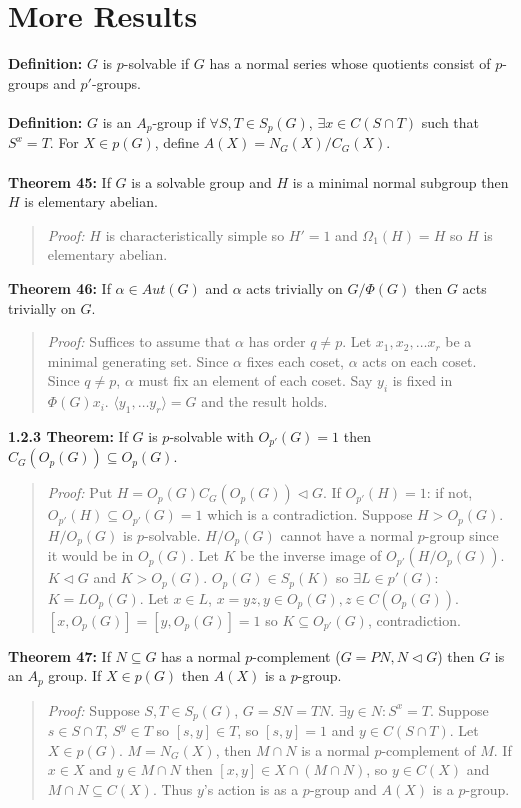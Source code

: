 \section {More Results}
{\bf Definition:} $G$ is $p$-solvable if $G$ has a normal series whose quotients consist of $p$-groups
and $p'$-groups.
\\
\\
{\bf Definition:} $G$ is an $A_p$-group if $\forall S, T \in S_p(G)$, $\exists x \in C(S \cap T)$ such that
$S^x = T$.  For $X \in p(G)$, define $A(X) = N_G(X)/C_G(X)$.
\\
\\
{\bf Theorem 45:} If $G$ is a solvable group and $H$ is a minimal normal subgroup then $H$ is elementary abelian.
\begin{quote}
\emph{Proof:}
$H$ is characteristically simple so $H' = 1$ and $\Omega_1(H) = H$ so $H$ is elementary abelian.
\end{quote}
{\bf Theorem 46:} If $\alpha \in Aut(G)$ and $\alpha$ acts trivially on $G/\Phi(G)$ then $G$ acts trivially on $G$.
\begin{quote}
\emph{Proof:}
Suffices to assume that $\alpha$ has order $q \neq p$.  Let $x_1 , x_2 , \ldots x_r$ be a minimal generating set.
Since $\alpha$ fixes each coset, $\alpha$ acts on each coset.  Since $q \neq p$, $\alpha$ must fix an element
of each coset. Say $y_i$ is fixed in $\Phi(G) x_i$.  $\langle y_1, \ldots y_r \rangle = G$ and the result holds.
\end{quote}
{\bf 1.2.3 Theorem:} If $G$ is $p$-solvable with $O_{p'}(G) = 1$ then $C_G(O_p(G)) \subseteq O_p(G)$.
\begin{quote}
\emph{Proof:}
Put $H = O_p(G) C_G(O_p(G)) \lhd G$.  If $O_{p'}(H) = 1$: if not, $O_{p'}(H) \subseteq O_{p'}(G) = 1$
which is a contradiction.  Suppose $H > O_p(G)$.  $H/O_p(G)$ is $p$-solvable.  $H/O_p(G)$ cannot have
a normal $p$-group since it would be in $O_p(G)$.  Let $K$ be the inverse image of $O_{p'}(H/O_p(G))$.
$K \lhd G$ and $K > O_p(G)$.  $O_p(G) \in S_p(K)$ so $\exists L \in p'(G)$: $K = LO_p(G)$.  Let $x \in L$,
$x = yz, y \in O_p(G), z \in C(O_p(G))$.  $[x, O_p(G)] = [y, O_p(G)] =1$ so $K \subseteq O_{p'}(G)$, contradiction.
\end{quote}
{\bf Theorem 47:} If $N \subseteq G$ has a normal $p$-complement ($G = P N, N \lhd G$) then $G$ is an
$A_p$ group.  If $X \in p(G)$ then $A(X)$ is a $p$-group.
\begin{quote}
\emph{Proof:}
Suppose $S, T \in S_p(G)$, $G = SN = TN$.  $\exists y \in N: S^x = T$.  Suppose $s \in S \cap T$, $S^y \in T$
so $[s, y] \in T$,  so $[s, y] = 1$ and $y \in C(S \cap T)$.  Let $X \in p(G)$.  $M = N_G(X)$, then $M \cap N$
is a normal $p$-complement of $M$.  If $x \in X$ and $y \in M \cap N$ then $[x,y] \in X \cap (M \cap N)$, so
$y \in C(X)$ and $M \cap N \subseteq C(X)$.  Thus $y$'s action is as a $p$-group and $A(X)$ is a $p$-group.
\end{quote}
